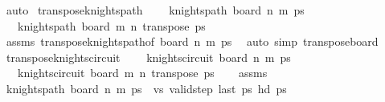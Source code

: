 \begin{isabellebody}
\ auto\isanewline
{}\isamarkupfalse%
%
\endisatagproof
{\isafoldproof}%
%
\isadelimproof
\isanewline
%
\endisadelimproof
\isanewline
{}\isamarkupfalse%
\ transpose{\isacharunderscore}{\kern0pt}knights{\isacharunderscore}{\kern0pt}path{\isacharcolon}{\kern0pt}\ \isanewline
\ \ \ {\isachardoublequoteopen}knights{\isacharunderscore}{\kern0pt}path\ {\isacharparenleft}{\kern0pt}board\ n\ m{\isacharparenright}{\kern0pt}\ ps{\isachardoublequoteclose}\ \isanewline
\ \ \ {\isachardoublequoteopen}knights{\isacharunderscore}{\kern0pt}path\ {\isacharparenleft}{\kern0pt}board\ m\ n{\isacharparenright}{\kern0pt}\ {\isacharparenleft}{\kern0pt}transpose\ ps{\isacharparenright}{\kern0pt}{\isachardoublequoteclose}\isanewline
%
\isadelimproof
\ \ %
\endisadelimproof
%
\isatagproof
{}\isamarkupfalse%
\ assms\ transpose{\isacharunderscore}{\kern0pt}knights{\isacharunderscore}{\kern0pt}path{\isacharprime}{\kern0pt}{\isacharbrackleft}{\kern0pt}of\ {\isachardoublequoteopen}board\ n\ m{\isachardoublequoteclose}\ ps{\isacharbrackright}{\kern0pt}\ \isamarkupfalse%
\ {\isacharparenleft}{\kern0pt}auto\ simp{\isacharcolon}{\kern0pt}\ transpose{\isacharunderscore}{\kern0pt}board{\isacharparenright}{\kern0pt}%
\endisatagproof
{\isafoldproof}%
%
\isadelimproof
\ \isanewline
%
\endisadelimproof
\isanewline
{}\isamarkupfalse%
\ transpose{\isacharunderscore}{\kern0pt}knights{\isacharunderscore}{\kern0pt}circuit{\isacharcolon}{\kern0pt}\ \isanewline
\ \ \ {\isachardoublequoteopen}knights{\isacharunderscore}{\kern0pt}circuit\ {\isacharparenleft}{\kern0pt}board\ n\ m{\isacharparenright}{\kern0pt}\ ps{\isachardoublequoteclose}\ \isanewline
\ \ \ {\isachardoublequoteopen}knights{\isacharunderscore}{\kern0pt}circuit\ {\isacharparenleft}{\kern0pt}board\ m\ n{\isacharparenright}{\kern0pt}\ {\isacharparenleft}{\kern0pt}transpose\ ps{\isacharparenright}{\kern0pt}{\isachardoublequoteclose}\isanewline
%
\isadelimproof
\ \ %
\endisadelimproof
%
\isatagproof
{}\isamarkupfalse%
\ assms\ \isanewline
{}\isamarkupfalse%
\ {\isacharminus}{\kern0pt}\isanewline
\ \ \isamarkupfalse%
\ {\isachardoublequoteopen}knights{\isacharunderscore}{\kern0pt}path\ {\isacharparenleft}{\kern0pt}board\ n\ m{\isacharparenright}{\kern0pt}\ ps{\isachardoublequoteclose}\ \ vs{\isacharcolon}{\kern0pt}\ {\isachardoublequoteopen}valid{\isacharunderscore}{\kern0pt}step\ {\isacharparenleft}{\kern0pt}last\ ps{\isacharparenright}{\kern0pt}\ {\isacharparenleft}{\kern0pt}hd\ ps{\isacharparenright}{\kern0pt}{\isachardoublequoteclose}\isanewline

\end{isabellebody}
